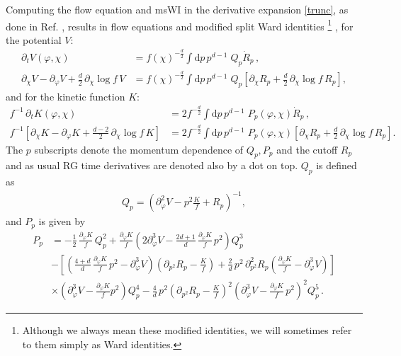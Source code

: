 \documentclass[11pt]{book}
\newcommand{\dclnf}{\,\partial_\chi\! \log\! f \,}
\numberwithin{equation}{chapter}
\begin{document}
Computing the flow equation and msWI in the derivative expansion \eqref{trunc}, as done
in Ref. \cite{Dietz:2015owa}, results in flow equations
and modified split Ward identities%
\footnote{
  Although we always mean these modified identities,
  we will sometimes refer to them  simply as Ward identities.
}%
, for the potential $V$:
\begin{align}
  \label{flowV}
  \partial_t V(\varphi,\chi)
  &= f(\chi)^{-\frac{d}{2}} \int \mathrm dp \, p^{d-1} \; Q_p \dot R_p \,, \\
  \label{msWIV}
  \partial_\chi V - \partial_\varphi V + \frac{d}{2} \dclnf V
  &= f(\chi)^{-\frac{d}{2}} \int \mathrm dp \, p^{d-1} \; Q_p
  \left[
    \partial_\chi R_p + \frac{d}{2} \dclnf R_p
  \right] ,
\end{align}
and for the kinetic function $K$:
\begin{align}
  \label{flowK}
  f^{-1} \, \partial_t K(\varphi,\chi)
  &= 2 f^{-\frac{d}{2}} \int \mathrm dp \, p^{d-1} \; P_p(\varphi,\chi)\dot R_p \,,\\
  \label{msWIK}
  f^{-1}
  \left[
    \partial_\chi K- \partial_\varphi K + \frac{d-2}{2} \dclnf K
  \right]
  &= 2 f^{-\frac{d}{2}} \int \mathrm dp \, p^{d-1} \; P_p(\varphi,\chi)
  \left[
    \partial_{\chi} R_p + \frac{d}{2} \dclnf R_p
  \right].
\end{align}
The $p$ subscripts denote the momentum dependence of $Q_p, P_p$ and the cutoff $R_p$ and as
usual RG time derivatives are denoted also by a dot on top. $Q_p$ is defined as
\begin{align}
	Q_p = \left( \partial^2_\varphi V - p^2\frac{K}{f} + R_p \right)^{-1} ,
	\label{Q}
\end{align}
and $P_p$ is given by
\begin{align}
	P_p &= - \frac{1}{2} \, \frac{\partial_\varphi K}{f} \, Q_p^2
	+ \frac{\partial_\varphi K}{f}
  \left(
    2 \partial_\varphi^3 V
    - \frac{2d+1}{d} \, \frac{\partial_{\varphi}K}{f} \, p^2
  \right) Q_p^3 \nonumber \\
  & -
  \left[
    \left(
      \frac{4+d}{d} \, \frac{\partial_\varphi K}{f} \, p^2
      - \partial^3_\varphi V
    \right)
    \left(
      \partial_{p^2} R_p - \frac{K}{f}
    \right)
    + \frac{2}{d} \, p^2 \, \partial^2_{p^2} R_p
    \left(
      \frac{\partial_\varphi K}{f} - \partial_\varphi^3 V
    \right)
  \right] \nonumber \\
  & \times \left(\partial_\varphi^3 V - \frac{\partial_\varphi K}{f}p^2\right)Q_p^4
  -\frac{4}{d} \, p^2
  \left(
    \partial_{p^2}R_p-\frac{K}{f}
  \right)^2
  \left(
    \partial_\varphi^3 V - \frac{\partial_\varphi K}{f} \, p^2
  \right)^2 Q_p^5 \,.
\end{align}
\end{document}
